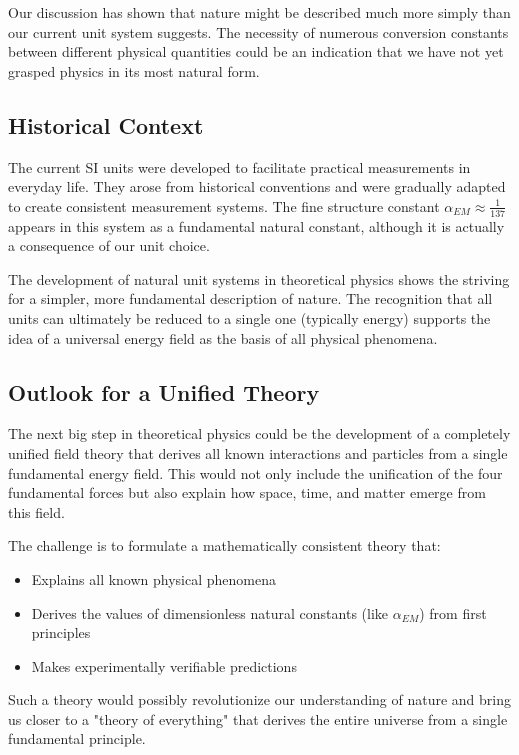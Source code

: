 \documentclass[12pt,a4paper]{article}
\begin{document}
	Our discussion has shown that nature might be described much more simply than our current unit system suggests. The necessity of numerous conversion constants between different physical quantities could be an indication that we have not yet grasped physics in its most natural form.
	
	\subsection{Historical Context}
	
	The current SI units were developed to facilitate practical measurements in everyday life. They arose from historical conventions and were gradually adapted to create consistent measurement systems. The fine structure constant $\alpha_{EM} \approx \frac{1}{137}$ appears in this system as a fundamental natural constant, although it is actually a consequence of our unit choice.
	
	The development of natural unit systems in theoretical physics shows the striving for a simpler, more fundamental description of nature. The recognition that all units can ultimately be reduced to a single one (typically energy) supports the idea of a universal energy field as the basis of all physical phenomena.
	
	\subsection{Outlook for a Unified Theory}
	
	The next big step in theoretical physics could be the development of a completely unified field theory that derives all known interactions and particles from a single fundamental energy field. This would not only include the unification of the four fundamental forces but also explain how space, time, and matter emerge from this field.
	
	The challenge is to formulate a mathematically consistent theory that:
	
	\begin{itemize}
		\item Explains all known physical phenomena
		\item Derives the values of dimensionless natural constants (like $\alpha_{EM}$) from first principles
		\item Makes experimentally verifiable predictions
	\end{itemize}
	
	Such a theory would possibly revolutionize our understanding of nature and bring us closer to a "theory of everything" that derives the entire universe from a single fundamental principle.
	
\end{document}

